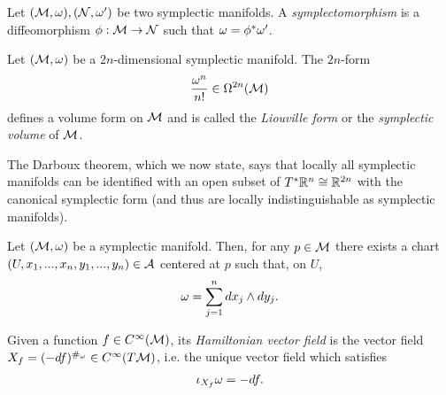 \documentclass[notas.tex]{subfiles}
\begin{document}
\begin{defn}
	Let $(\mathcal{M}, \omega), (\mathcal{N}, \omega')$ be two symplectic manifolds. A \emph{symplectomorphism} is a diffeomorphism $\phi: \mathcal{M} \to \mathcal{N}$ such that $\omega = \phi^* \omega'$.
\end{defn}

\begin{prop}
	Let $(\mathcal{M}, \omega)$ be a $2n$-dimensional symplectic manifold. The $2n$-form
	\begin{align*}
		\frac{\omega^n}{n!} \in \Omega^{2n}(\mathcal{M})
	\end{align*}
	defines a volume form on $\mathcal{M}$ and is called the \emph{Liouville form} or the \emph{symplectic volume} of $\mathcal{M}$.
\end{prop}

The Darboux theorem, which we now state, says that locally all symplectic manifolds can be identified with an open subset of $T^* \mathbb{R}^n \cong \mathbb{R}^{2n}$ with the canonical symplectic form (and thus are locally indistinguishable as symplectic manifolds). 

\begin{thm}[Darboux]\label{thm_darboux_coord}
	Let $(\mathcal{M}, \omega)$ be a symplectic manifold. Then, for any $p \in \mathcal{M}$ there exists a chart $(U, x_1,...,x_n,y_1,...,y_n) \in \mathcal{A}$ centered at $p$ such that, on $U$,
	\begin{align*}
		\omega = \sum_{j=1}^n d x_j \wedge d y_j.
	\end{align*}
\end{thm}
\begin{defn}
	Given a function $f \in C^\infty(\mathcal{M})$, its \emph{Hamiltonian vector field} is the vector field $X_f = (-df)^{\#_\omega} \in C^\infty(T \mathcal{M})$, i.e. the unique vector field which satisfies
	\begin{align*}
		\iota_{X_f}\omega = - df.
	\end{align*}
\end{defn}
\end{document}
